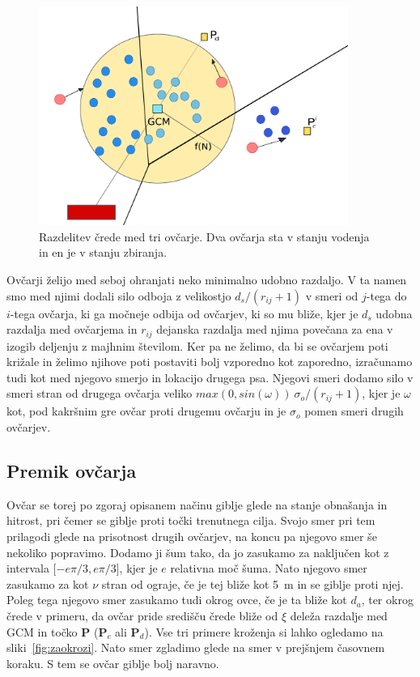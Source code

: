\begin{figure}[ht]  %
	\centering
	\includegraphics[width=0.9\textwidth]{../poglavja/images/voronoi.pdf}
	\caption[Razdelitev črede in nalog]{Razdelitev črede med tri ovčarje. Dva ovčarja sta v stanju vodenja in en je v stanju zbiranja.} %
	\label{fig:voronoi}
\end{figure}

Ovčarji želijo med seboj ohranjati neko minimalno udobno razdaljo. V ta namen smo med njimi dodali silo odboja z velikostjo $d_s / (r_{ij} + 1)$ v smeri od $j$-tega do $i$-tega ovčarja, ki ga močneje odbija od ovčarjev, ki so mu bliže, kjer je $d_s$ udobna razdalja med ovčarjema in $r_{ij}$ dejanska razdalja med njima povečana za ena v izogib deljenju z majhnim številom. Ker pa ne želimo, da bi se ovčarjem poti križale in želimo njihove poti postaviti bolj vzporedno kot zaporedno, izračunamo tudi kot med njegovo smerjo in lokacijo drugega psa. Njegovi smeri dodamo silo v smeri stran od drugega ovčarja veliko $max(0, sin(\omega))~\sigma_o / (r_{ij} + 1)$, kjer je $\omega$ kot, pod kakršnim gre ovčar proti drugemu ovčarju in je $\sigma_o$ pomen smeri drugih ovčarjev.

\subsection{Premik ovčarja}

Ovčar se torej po zgoraj opisanem načinu giblje glede na stanje obnašanja in hitrost, pri čemer se giblje proti točki trenutnega cilja. Svojo smer pri tem prilagodi glede na prisotnost drugih ovčarjev, na koncu pa njegovo smer še nekoliko popravimo. Dodamo ji šum tako, da jo zasukamo za naključen kot z intervala $\lbrack -e\pi/3, e\pi/3\rbrack$, kjer je $e$ relativna moč šuma. Nato njegovo smer zasukamo za kot $\nu$ stran od ograje, če je tej bliže kot 5~m in se giblje proti njej. Poleg tega njegovo smer zasukamo tudi okrog ovce, če je ta bliže kot $d_a$, ter okrog črede v primeru, da ovčar pride središču črede bliže od $\xi$ deleža razdalje med GCM in točko $\mathbf{P}$ ($\mathbf{P}_c$ ali $\mathbf{P}_d$). Vse tri primere kroženja si lahko ogledamo na sliki~\ref{fig:zaokrozi}. Nato smer zgladimo glede na smer v prejšnjem časovnem koraku. S tem se ovčar giblje bolj naravno.

